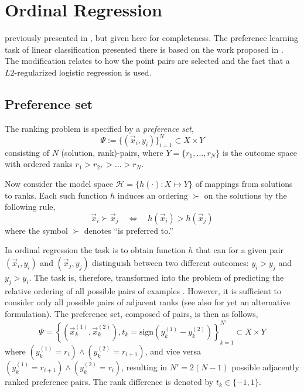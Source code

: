 
\chapter{Ordinal Regression}\label{ch:ordinal} 
 previously presented in 
\cite{Ru06:PPSN}, but given here for completeness. The preference learning task 
of linear classification presented there is based on the work proposed in 
\citep{main:LIBLINEAR,Lin08:newtontrustregion}. 
The modification relates to how the point pairs are selected and the fact that 
a $L2$-regularized logistic regression is used. 

\section{Preference set}
The ranking problem is specified by a \emph{preference set}, 
\begin{equation}
\Psi := \{(\vec{x}_i,y_i)\}_{i=1}^N \subset X \times Y
\end{equation}
consisting of $N$ (solution, rank)-pairs, where $Y=\{r_1,\ldots,r_N\}$ 
is the outcome space with ordered ranks $r_1> r_2,> \ldots > r_N$.  

\clearpage
Now consider the model space $\mathcal{H} = \{h(\cdot) : X \mapsto Y\}$ of 
mappings from solutions to ranks. Each such function $h$ induces an ordering 
$\succ$ on the solutions  by the following rule,
\begin{equation}\label{eq:linear}
	\vec{x}_i \succ \vec{x}_j \quad \Leftrightarrow \quad h(\vec{x}_i) > h(\vec{x}_j)
\end{equation}
where the symbol $\succ$ denotes ``is preferred to.''  

In ordinal regression the task is to obtain function $h$ that can for a given pair $(\vec{x}_i,y_i)$ and $(\vec{x}_j,y_j)$ distinguish between two different outcomes: $y_i > y_j$ and $y_j > y_i$. The task is, therefore, transformed into the problem of predicting the relative ordering of all possible pairs of examples \citep{Herbrich00,Joachims02}.  However, it is sufficient to consider only all possible pairs of adjacent ranks (see also \cite{ShaweTaylor04:book} for yet an alternative formulation).  The preference set, composed of pairs, is then as follows,
\begin{equation}
	\Psi = \left\{(\vec{x}_k^{(1)}, \vec{x}_k^{(2)}),t_k=\text{sign}(y_k^{(1)} - 
	y_k^{(2)})\right\}_{k=1}^{N'} \subset X\times Y  \label{eq:PrefSet:problem}
\end{equation}
where $(y_k^{(1)} = r_i) \wedge (y_k^{(2)} = r_{i+1})$, and vice versa 
$(y_k^{(1)} = r_{i+1}) \wedge (y_k^{(2)} = r_{i})$, resulting in $N'=2(N-1)$ 
possible adjacently ranked preference pairs. The rank difference is denoted by 
$t_k\in\{-1,1\}$.

